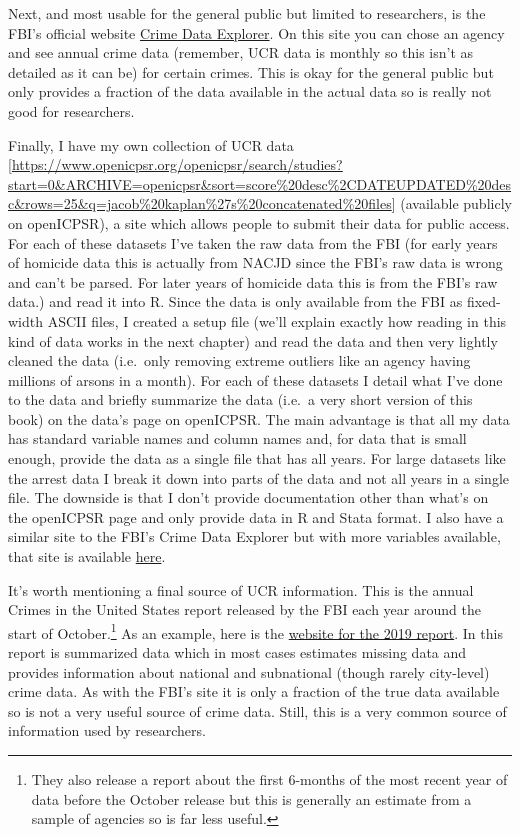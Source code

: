 \documentclass[
  12pt,
  openany]{book}
\begin{document}
Next, and most usable for the general public but limited to researchers, is the FBI's official website \href{https://crime-data-explorer.fr.cloud.gov/}{Crime Data Explorer}. On this site you can chose an agency and see annual crime data (remember, UCR data is monthly so this isn't as detailed as it can be) for certain crimes. This is okay for the general public but only provides a fraction of the data available in the actual data so is really not good for researchers.

Finally, I have my own collection of UCR data {[}\url{https://www.openicpsr.org/openicpsr/search/studies?start=0\&ARCHIVE=openicpsr\&sort=score\%20desc\%2CDATEUPDATED\%20desc\&rows=25\&q=jacob\%20kaplan\%27s\%20concatenated\%20files}{]} (available publicly on openICPSR), a site which allows people to submit their data for public access. For each of these datasets I've taken the raw data from the FBI (for early years of homicide data this is actually from NACJD since the FBI's raw data is wrong and can't be parsed. For later years of homicide data this is from the FBI's raw data.) and read it into R. Since the data is only available from the FBI as fixed-width ASCII files, I created a setup file (we'll explain exactly how reading in this kind of data works in the next chapter) and read the data and then very lightly cleaned the data (i.e.~only removing extreme outliers like an agency having millions of arsons in a month). For each of these datasets I detail what I've done to the data and briefly summarize the data (i.e.~a very short version of this book) on the data's page on openICPSR. The main advantage is that all my data has standard variable names and column names and, for data that is small enough, provide the data as a single file that has all years. For large datasets like the arrest data I break it down into parts of the data and not all years in a single file. The downside is that I don't provide documentation other than what's on the openICPSR page and only provide data in R and Stata format. I also have a similar site to the FBI's Crime Data Explorer but with more variables available, that site is available \href{jacobdkaplan.com/}{here}.

It's worth mentioning a final source of UCR information. This is the annual Crimes in the United States report released by the FBI each year around the start of October.\footnote{They also release a report about the first 6-months of the most recent year of data before the October release but this is generally an estimate from a sample of agencies so is far less useful.} As an example, here is the \href{https://ucr.fbi.gov/crime-in-the-u.s/2019/crime-in-the-u.s.-2019}{website for the 2019 report}. In this report is summarized data which in most cases estimates missing data and provides information about national and subnational (though rarely city-level) crime data. As with the FBI's site it is only a fraction of the true data available so is not a very useful source of crime data. Still, this is a very common source of information used by researchers.
\end{document}

